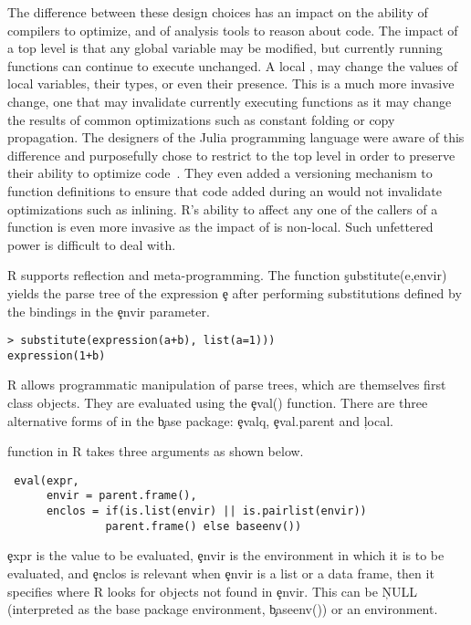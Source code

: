 \documentclass[USenglish,cleveref, autoref, thm-restate]{lipics-v2019}
\begin{document}
The difference between these design choices has an impact on the
ability of compilers to optimize, and of analysis tools to reason
about code. The impact of a top level \eval is that any global
variable may be modified, but currently running functions can continue
to execute unchanged. A local \eval, may change the values of local
variables, their types, or even their presence. This is a much more
invasive change, one that may invalidate currently executing functions
as it may change the results of common optimizations such as constant
folding or copy propagation. The designers of the Julia programming
language were aware of this difference and purposefully chose to
restrict \eval to the top level in order to preserve their ability to
optimize code~\cite{oopsla18a}. They even added a versioning mechanism
to function definitions to ensure that code added during an \eval
would not invalidate optimizations such as inlining.  R's ability to
affect any one of the callers of a function is even more invasive as
the impact of \eval is non-local. Such unfettered power is difficult
to deal with.



R supports reflection and meta-programming. The function
\c{substitute(e,envir)} yields the parse tree of the expression \c{e}
after performing substitutions defined by the bindings in the
\c{envir} parameter.

\begin{lstlisting}
> substitute(expression(a+b), list(a=1)))  
expression(1+b)
\end{lstlisting}

\noindent
R allows programmatic manipulation of parse trees, which are themselves
first class objects. They are evaluated using the \c{eval()}
function. There are three alternative forms  of \eval in the \c{base} package:
\c{evalq}, \c{eval.parent} and \c{local}.

\eval function in R takes three arguments as shown below.
\begin{lstlisting}
 eval(expr,
      envir = parent.frame(),
      enclos = if(is.list(envir) || is.pairlist(envir))
               parent.frame() else baseenv())
\end{lstlisting}           

\c{expr} is the value to be evaluated, \c{envir}
is the environment in which it is to be evaluated, and \c{enclos} is
relevant when \c{envir} is a list or a data frame, then it specifies where R
looks for objects not found in \c{envir}. This can be \c{NULL} (interpreted
as the base package environment, \c{baseenv()}) or an environment.
\end{document}
